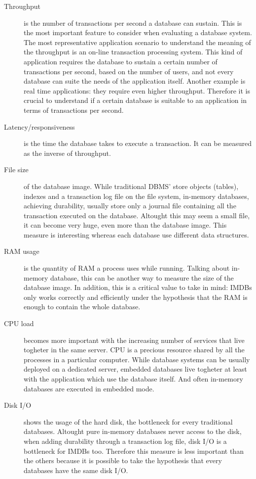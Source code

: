 \begin{description}

	\item[Throughput] is the number of transactions per second a database can sustain. This is the most important feature to consider when evaluating a database system. The most representative application scenario to understand the meaning of the throughput is an on-line transaction processing system. This kind of application requires the database to sustain a certain number of transactions per second, based on the number of users, and not every database can suite the needs of the application itself. Another example is real time applications: they require even higher throughput. Therefore it is crucial to understand if a certain database is suitable to an application in terms of transactions per second.
	
	\item[Latency/responsiveness] is the time the database takes to execute a transaction. It can be measured as the inverse of throughput.
	
	\item[File size] of the database image. While traditional DBMS' store objects (tables), indexes and a transaction log file on the file system, in-memory databases, achieving durability, usually store only a journal file containing all the transaction executed on the database. Altought this may seem a small file, it can become very huge, even more than the database image. This measure is interesting whereas each database use different data structures.
	
	\item[RAM usage] is the quantity of RAM a process uses while running. Talking about in-memory database, this can be another way to measure the size of the database image. In addition, this is a critical value to take in mind: IMDBs only works correctly and efficiently under the hypothesis that the RAM is enough to contain the whole database.
	
	\item[CPU load] becomes more important with the increasing number of services that live togheter in the same server. CPU is a precious resource shared by all the processes in a particular computer. While database systems can be usually deployed on a dedicated server, embedded databases live togheter at least with the application which use the database itself. And often in-memory databases are executed in embedded mode.
	
	\item[Disk I/O] shows the usage of the hard disk, the bottleneck for every traditional databases. Altought pure in-memory databases never access to the disk, when adding durability through a transaction log file, disk I/O is a bottleneck for IMDBs too. Therefore this measure is less important than the others because it is possible to take the hypothesis that every databases have the same disk I/O.
	

\end{description}
